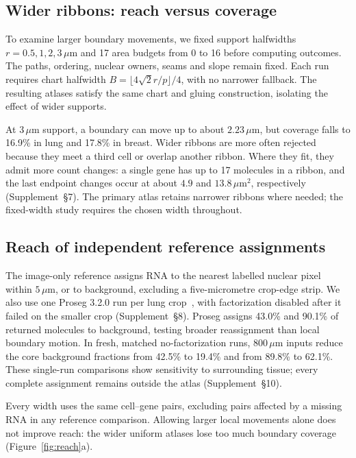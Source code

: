 \documentclass[10pt,letterpaper]{article}
\begin{document}
\subsection{Wider ribbons: reach versus coverage}\label{sec:reach}
To examine larger boundary movements, we fixed support halfwidths $r=0.5,1,2,3\,\mu\mathrm m$ and 17 area budgets from 0 to 16 before computing outcomes. The paths, ordering, nuclear owners, seams and slope remain fixed. Each run requires chart halfwidth $B=\lfloor4\sqrt2r/p\rfloor/4$, with no narrower fallback. The resulting atlases satisfy the same chart and gluing construction, isolating the effect of wider supports.

At $3\,\mu\mathrm m$ support, a boundary can move up to about $2.23\,\mu\mathrm m$, but coverage falls to 16.9\% in lung and 17.8\% in breast. Wider ribbons are more often rejected because they meet a third cell or overlap another ribbon. Where they fit, they admit more count changes: a single gene has up to 17 molecules in a ribbon, and the last endpoint changes occur at about $4.9$ and $13.8\,\mu\mathrm m^2$, respectively (Supplement~\S7). The primary atlas retains narrower ribbons where needed; the fixed-width study requires the chosen width throughout.


\FloatBarrier
\subsection{Reach of independent reference assignments}
The image-only reference assigns RNA to the nearest labelled nuclear pixel within $5\,\mu\mathrm m$, or to background, excluding a five-micrometre crop-edge strip. We also use one Proseg 3.2.0 run per lung crop~\cite{proseg}, with factorization disabled after it failed on the smaller crop (Supplement~\S8). Proseg assigns 43.0\% and 90.1\% of returned molecules to background, testing broader reassignment than local boundary motion. In fresh, matched no-factorization runs, $800\,\mu\mathrm m$ inputs reduce the core background fractions from 42.5\% to 19.4\% and from 89.8\% to 62.1\%. These single-run comparisons show sensitivity to surrounding tissue; every complete assignment remains outside the atlas (Supplement~\S10).

Every width uses the same cell--gene pairs, excluding pairs affected by a missing RNA in any reference comparison. Allowing larger local movements alone does not improve reach: the wider uniform atlases lose too much boundary coverage (Figure~\ref{fig:reach}a).
\end{document}
